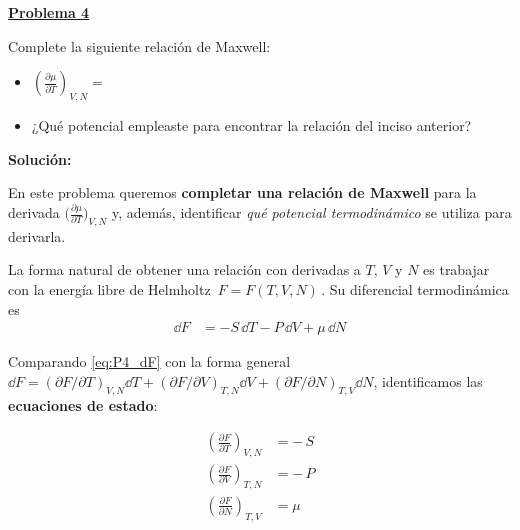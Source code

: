 \documentclass{article}
\newenvironment{AGbox}[1][7]%
{%
  \begin{tcolorbox}[
    enhanced, breakable,
    colframe=AppleGreen,
    colback=AppleGreen!#1,
    boxrule=1pt,
    borderline west={2mm}{-10mm}{AppleGreen},
    sharp corners=southwest,
    left=14pt,right=14pt,top=10pt,bottom=10pt,
     boxsep=6pt,
  ]%
}{%
  \end{tcolorbox}%
}
\begin{document}

\begin{AGbox}[8]
\textcolor{Apple Green}{\textbf{\underline{Problema 4}}} \vspace{2mm}

Complete la siguiente relación de Maxwell:

\begin{itemize}
  \item[(a)]  
  \(
  \left(\frac{\partial \mu}{\partial T}\right)_{V,N}
  =
  \)

  \item[(b)]
  ¿Qué potencial empleaste para encontrar la relación del inciso anterior?
\end{itemize}

\end{AGbox}
\vspace{0.5cm}

\textcolor{Tuscany}{\textbf{Solución:}}

En este problema queremos \textcolor{Tarawera}{\textbf{completar una relación de Maxwell}}
para la derivada
\(\big(\frac{\partial \mu}{\partial T}\big)_{V,N}\) y, además, identificar
\emph{qué potencial termodinámico} se utiliza para derivarla.

\vspace{0.3cm}

La forma natural de obtener una relación con derivadas a \(T\), \(V\) y \(N\)
es trabajar con la energía libre de Helmholtz
\(\,F = F(T,V,N)\,\).  
Su diferencial termodinámica es
\begin{equation}
\begin{split}
\dd F
&= -S\,\dd T - P\,\dd V + \mu\,\dd N
\end{split}
\label{eq:P4_dF}
\end{equation}

Comparando \eqref{eq:P4_dF} con la forma general
\(\dd F = (\partial F/\partial T)_{V,N}\dd T
     + (\partial F/\partial V)_{T,N}\dd V
     + (\partial F/\partial N)_{T,V}\dd N\),
identificamos las \textcolor{Cinnabar}{\textbf{ecuaciones de estado}}:

\begin{equation}
\begin{split}
\left(\frac{\partial F}{\partial T}\right)_{V,N}
&= -\,S \\[4pt]
\left(\frac{\partial F}{\partial V}\right)_{T,N}
&= -\,P \\[4pt]
\left(\frac{\partial F}{\partial N}\right)_{T,V}
&= \mu
\end{split}
\label{eq:P4_eos_desdeF}
\end{equation}
\end{document}
